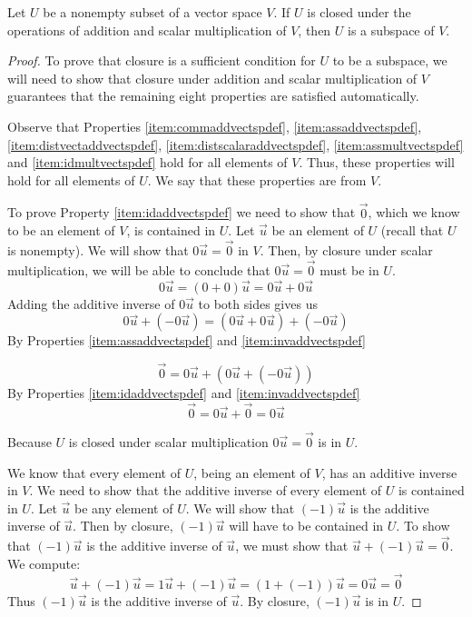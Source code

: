 \documentclass{ximera}
\begin{document}
\begin{theorem}\label{th:subspacetestabstract}
Let $U$ be a nonempty subset of a vector space $V$.  If $U$ is closed under the operations of addition and scalar multiplication of $V$, then $U$ is a subspace of $V$.
\end{theorem}
\begin{proof}
To prove that closure is a sufficient condition for $U$ to be a subspace, we will need to show that closure under addition and scalar multiplication of $V$ guarantees that the remaining eight properties are satisfied automatically.  

Observe that Properties \ref{item:commaddvectspdef}, \ref{item:assaddvectspdef}, \ref{item:distvectaddvectspdef}, \ref{item:distscalaraddvectspdef}, \ref{item:assmultvectspdef} and \ref{item:idmultvectspdef} hold for all elements of $V$.  Thus, these properties will hold for all elements of $U$.  We say that these properties are  from $V$.

To prove Property \ref{item:idaddvectspdef} we need to show that $\vec{0}$, which we know to be an element of $V$, is contained in $U$.  Let $\vec{u}$ be an element of $U$ (recall that $U$ is nonempty).  We will show that $0\vec{u}=\vec{0}$ in $V$.  Then, by closure under scalar multiplication, we will be able to conclude that $0\vec{u}=\vec{0}$ must be in $U$.
$$0\vec{u}=(0+0)\vec{u}=0\vec{u}+0\vec{u}$$
Adding the additive inverse of $0\vec{u}$ to both sides gives us
$$0\vec{u}+(-0\vec{u})=(0\vec{u}+0\vec{u})+(-0\vec{u})$$
By Properties \ref{item:assaddvectspdef} and \ref{item:invaddvectspdef}

$$\vec{0}=0\vec{u}+(0\vec{u}+(-0\vec{u}))$$
By Properties \ref{item:idaddvectspdef} and \ref{item:invaddvectspdef}
$$\vec{0}=0\vec{u}+\vec{0}=0\vec{u}$$

Because $U$ is closed under scalar multiplication $0\vec{u}=\vec{0}$ is in $U$.

We know that every element of $U$, being an element of $V$, has an additive inverse  in $V$.  We need to show that the additive inverse of every element of $U$ is contained in $U$. Let $\vec{u}$ be any element of $U$.  We will show that $(-1)\vec{u}$ is the additive inverse of $\vec{u}$.  Then by closure, $(-1)\vec{u}$ will have to be contained in $U$.  To show that $(-1)\vec{u}$ is the additive inverse of $\vec{u}$, we must show that $\vec{u}+(-1)\vec{u}=\vec{0}$.  We compute:
$$\vec{u}+(-1)\vec{u}=1\vec{u}+(-1)\vec{u}=(1+(-1))\vec{u}=0\vec{u}=\vec{0}$$
Thus $(-1)\vec{u}$ is the additive inverse of $\vec{u}$. By closure, $(-1)\vec{u}$ is in $U$.  
\end{proof}
\end{document}
